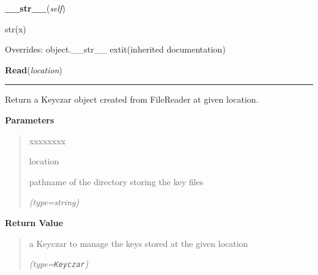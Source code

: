     \vspace{0.5ex}

\hspace{.8\funcindent}\begin{boxedminipage}{\funcwidth}

    \raggedright \textbf{\_\_str\_\_}(\textit{self})

\setlength{\parskip}{2ex}
    str(x)

\setlength{\parskip}{1ex}
      Overrides: object.\_\_str\_\_ 	extit{(inherited documentation)}

    \end{boxedminipage}

    \label{keyczar:keyczar:Keyczar:Read}

    \vspace{0.5ex}

\hspace{.8\funcindent}\begin{boxedminipage}{\funcwidth}

    \raggedright \textbf{Read}(\textit{location})

    \vspace{-1.5ex}

    \rule{\textwidth}{0.5\fboxrule}
\setlength{\parskip}{2ex}
    Return a Keyczar object created from FileReader at given location.

\setlength{\parskip}{1ex}
      \textbf{Parameters}
      \vspace{-1ex}

      \begin{quote}
        \begin{Ventry}{xxxxxxxx}

          \item[location]

          pathname of the directory storing the key files

            {\it (type=string)}

        \end{Ventry}

      \end{quote}

      \textbf{Return Value}
    \vspace{-1ex}

      \begin{quote}
      a Keyczar to manage the keys stored at the given location

      {\it (type=\texttt{Keyczar})}

      \end{quote}

    \end{boxedminipage}

